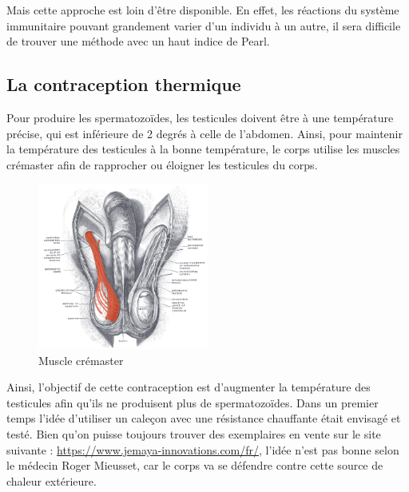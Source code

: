 \documentclass[12pt,a4paper]{report}
\begin{document}
Mais cette approche est loin d'être disponible. En effet, les réactions du système immunitaire pouvant grandement varier d'un individu à un autre, il sera difficile de trouver une méthode avec un haut indice de Pearl. \cite{mclaughlinThereRoleImmunocontraception2011}

\subsection{La contraception thermique}

Pour produire les spermatozoïdes, les testicules doivent être à une température précise, qui est inférieure de 2 degrés à celle de l'abdomen. \cite{Testicule2023}
Ainsi, pour maintenir la température des testicules à la bonne température, le corps utilise les muscles crémaster afin de rapprocher ou éloigner les testicules du corps. \cite{MuscleCremasterWikipedia}

\begin{figure}[h]
    \centering
    \includegraphics[width=0.5\textwidth]{images/scientiphique/Musculus_cremaster.png}
    \caption{Muscle crémaster}
    \label{fig:muscles-cremaster}
\end{figure}

Ainsi, l'objectif de cette contraception est d'augmenter la température des testicules afin qu'ils ne produisent plus de spermatozoïdes. \cite{wallachRoleTemperatureRegulation1988}
Dans un premier temps l'idée d'utiliser un caleçon avec une résistance chauffante était envisagé et testé. Bien qu'on puisse toujours trouver des exemplaires en vente sur le site suivante : \href{https://www.jemaya-innovations.com/fr/}{https://www.jemaya-innovations.com/fr/}, l'idée n'est pas bonne selon le médecin Roger Mieusset, car le corps va se défendre contre cette source de chaleur extérieure. \cite{guillaumedaudinContraceptesEnqueteDernier2022}
\end{document}
